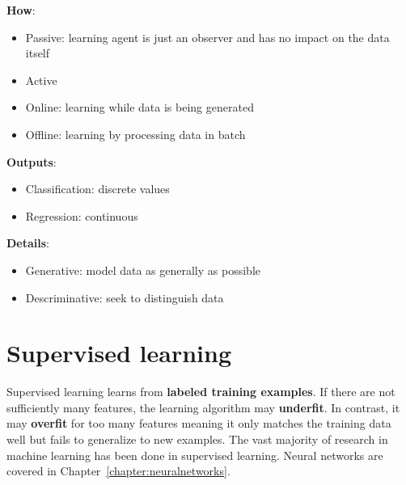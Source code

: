 \documentclass{report}
\begin{document}
{\bf How}:
\begin{itemize}
  \item Passive: learning agent is just an observer and has no impact on the data itself
  \item Active
  \item Online: learning while data is being generated
  \item Offline: learning by processing data in batch
\end{itemize}

{\bf Outputs}:
\begin{itemize}
  \item Classification: discrete values
  \item Regression: continuous
\end{itemize}

{\bf Details}:
\begin{itemize}
  \item Generative: model data as generally as possible
  \item Descriminative: seek to distinguish data
\end{itemize}


\chapter{Supervised learning}
Supervised learning learns from {\bf labeled training examples}. If there are not sufficiently many features, the learning algorithm may {\bf underfit}.
In contrast, it may {\bf overfit} for too many features meaning it only matches the training data well but fails to generalize to new examples.
The vast majority of research in machine learning has been done in supervised learning.
Neural networks are covered in Chapter~\ref{chapter:neuralnetworks}.
\end{document}
